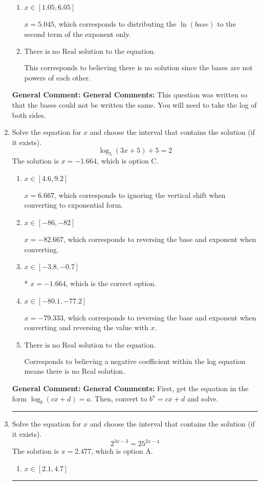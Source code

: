 \documentclass{extbook}[14pt]
\newcommand{\litem}[1]{\item #1

\rule{\textwidth}{0.4pt}}
\begin{document}
\begin{enumerate}
{\begin{enumerate}[label=\Alph*.]
$x = -0.498$, which corresponds to distributing the $\ln(base)$ to the first term of the exponent only.
\item \( x \in [1.05, 6.05] \)

$x = 5.045$, which corresponds to distributing the $\ln(base)$ to the second term of the exponent only.
\item \( \text{There is no Real solution to the equation.} \)

This corresponds to believing there is no solution since the bases are not powers of each other.
\end{enumerate}

\textbf{General Comment:} \textbf{General Comments:} This question was written so that the bases could not be written the same. You will need to take the log of both sides.
}
\litem{
Solve the equation for $x$ and choose the interval that contains the solution (if it exists).
\[ \log_{5}{(3x+5)}+5 = 2 \]The solution is \( x = -1.664 \), which is option C.\begin{enumerate}[label=\Alph*.]
\item \( x \in [4.6, 9.2] \)

$x = 6.667$, which corresponds to ignoring the vertical shift when converting to exponential form.
\item \( x \in [-86, -82] \)

$x = -82.667$, which corresponds to reversing the base and exponent when converting.
\item \( x \in [-3.8, -0.7] \)

* $x = -1.664$, which is the correct option.
\item \( x \in [-80.1, -77.2] \)

$x = -79.333$, which corresponds to reversing the base and exponent when converting and reversing the value with $x$.
\item \( \text{There is no Real solution to the equation.} \)

Corresponds to believing a negative coefficient within the log equation means there is no Real solution.
\end{enumerate}

\textbf{General Comment:} \textbf{General Comments:} First, get the equation in the form $\log_b{(cx+d)} = a$. Then, convert to $b^a = cx+d$ and solve.
}
\litem{
Solve the equation for $x$ and choose the interval that contains the solution (if it exists).
\[ 2^{3x-3} = 25^{2x-4} \]The solution is \( x = 2.477 \), which is option A.\begin{enumerate}[label=\Alph*.]
\item \( x \in [2.1, 4.7] \)


\end{enumerate}}
\end{enumerate}
\end{document}
